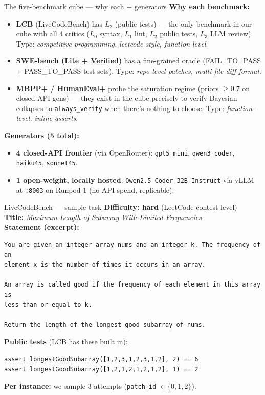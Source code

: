 \documentclass[10pt]{beamer}
\newcommand{\good}[1]{\textcolor{accentGreen}{\textbf{#1}}}
\newcommand{\info}[1]{\textcolor{primaryBlue}{\textbf{#1}}}
\begin{document}
\begin{frame}{The five-benchmark cube --- why each + generators}
\vspace{0.3cm}
\info{Why each benchmark:}
\begin{itemize}\setlength\itemsep{4pt}
\item \textcolor{primaryBlue}{\textbf{LCB} (LiveCodeBench)} has $L_2$ (public
  tests) --- the only benchmark in our cube with all 4 critics
  ($L_0$ syntax, $L_1$ lint, $L_2$ public tests, $L_3$ LLM review).
  Type: \emph{competitive programming, leetcode-style, function-level}.
\item \textcolor{accentGreen}{\textbf{SWE-bench (Lite + Verified)}} has a
  fine-grained oracle (FAIL\_TO\_PASS + PASS\_TO\_PASS test sets).
  Type: \emph{repo-level patches, multi-file diff format}.
\item \textcolor{accentOrange}{\textbf{MBPP+ / HumanEval+}} probe the saturation
  regime (priors $\geq 0.7$ on closed-API gens) --- they exist in the cube
  precisely to verify Bayesian collapses to \texttt{always\_verify} when there's
  nothing to choose. Type: \emph{function-level, inline asserts}.
\end{itemize}

\vspace{0.3cm}
\info{Generators (5 total):}
\begin{itemize}\setlength\itemsep{2pt}
\item \textbf{4 closed-API frontier} (via OpenRouter): \texttt{gpt5\_mini},
  \texttt{qwen3\_coder}, \texttt{haiku45}, \texttt{sonnet45}.
\item \good{\textbf{1 open-weight, locally hosted}}:
  \texttt{Qwen2.5-Coder-32B-Instruct} via vLLM at \texttt{:8003} on Runpod-1
  (no API spend, replicable).
\end{itemize}
\end{frame}

\begin{frame}[fragile]{LiveCodeBench --- sample task}
\info{Difficulty: hard} (LeetCode contest level)\\[1mm]
\info{Title:} \emph{Maximum Length of Subarray With Limited Frequencies}\\
\info{Statement (excerpt):}
\begin{lstlisting}[basicstyle=\ttfamily\scriptsize]
You are given an integer array nums and an integer k. The frequency of an
element x is the number of times it occurs in an array.

An array is called good if the frequency of each element in this array is
less than or equal to k.

Return the length of the longest good subarray of nums.
\end{lstlisting}
\info{Public tests} (LCB has these built in):
\begin{lstlisting}[basicstyle=\ttfamily\scriptsize]
assert longestGoodSubarray([1,2,3,1,2,3,1,2], 2) == 6
assert longestGoodSubarray([1,2,1,2,1,2,1,2], 1) == 2
\end{lstlisting}
\info{Per instance:} we sample 3 attempts (\texttt{patch\_id} $\in \{0,1,2\}$).
\end{frame}
\end{document}
